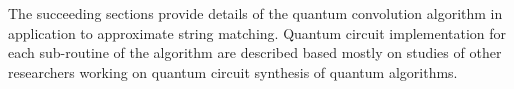 The succeeding sections provide details of the quantum convolution algorithm in application to approximate string matching. Quantum circuit implementation for each sub-routine of the algorithm are described based mostly on studies of other researchers working on quantum circuit synthesis of quantum algorithms.

%

